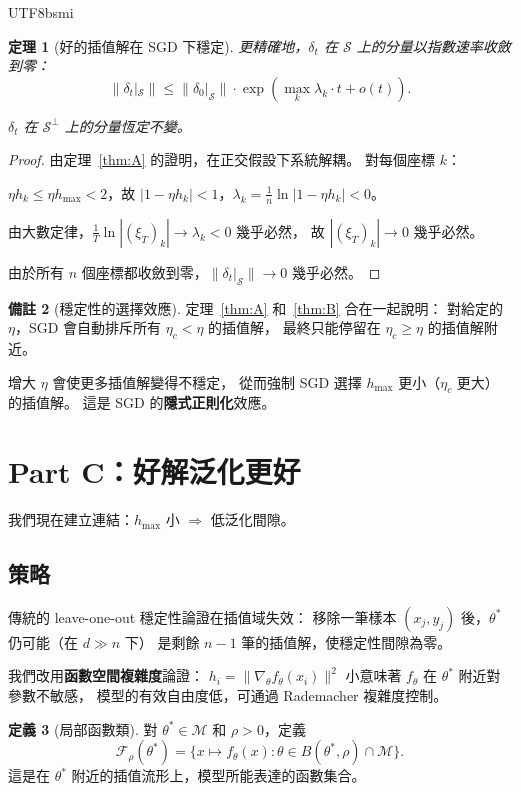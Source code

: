 \documentclass[11pt,a4paper]{article}
\newtheorem{theorem}{定理}
\theoremstyle{definition}
\newtheorem{definition}[theorem]{定義}
\newtheorem{remark}[theorem]{備註}
\newcommand{\cM}{\mathcal{M}}
\newcommand{\cS}{\mathcal{S}}
\newcommand{\cF}{\mathcal{F}}
\begin{document}
\begin{CJK}{UTF8}{bsmi}
\begin{theorem}[好的插值解在 SGD 下穩定]
  更精確地，$\delta_t$ 在 $\cS$ 上的分量以指數速率收斂到零：
  \[
    \|\delta_t|_\cS\|\leq\|\delta_0|_\cS\|\cdot\exp\!\left(\max_k\lambda_k\cdot t+o(t)\right).
  \]

  $\delta_t$ 在 $\cS^\perp$ 上的分量恆定不變。
\end{theorem}

\begin{proof}
  由定理~\ref{thm:A} 的證明，在正交假設下系統解耦。
  對每個座標 $k$：

  $\eta h_k\leq\eta h_{\max}<2$，故 $|1-\eta h_k|<1$，$\lambda_k=\frac{1}{n}\ln|1-\eta h_k|<0$。

  由大數定律，$\frac{1}{T}\ln|(\xi_T)_k|\to\lambda_k<0$ 幾乎必然，
  故 $|(\xi_T)_k|\to 0$ 幾乎必然。

  由於所有 $n$ 個座標都收斂到零，$\|\delta_t|_\cS\|\to 0$ 幾乎必然。
\end{proof}

\begin{remark}[穩定性的選擇效應]
  定理~\ref{thm:A} 和~\ref{thm:B} 合在一起說明：
  對給定的 $\eta$，SGD 會自動排斥所有 $\eta_c<\eta$ 的插值解，
  最終只能停留在 $\eta_c\geq\eta$ 的插值解附近。

  增大 $\eta$ 會使更多插值解變得不穩定，
  從而強制 SGD 選擇 $h_{\max}$ 更小（$\eta_c$ 更大）的插值解。
  這是 SGD 的\textbf{隱式正則化}效應。
\end{remark}

\section{Part C：好解泛化更好}

我們現在建立連結：$h_{\max}$ 小 $\Rightarrow$ 低泛化間隙。

\subsection{策略}

傳統的 leave-one-out 穩定性論證在插值域失效：
移除一筆樣本 $(x_j,y_j)$ 後，$\theta^*$ 仍可能（在 $d\gg n$ 下）
是剩餘 $n-1$ 筆的插值解，使穩定性間隙為零。

我們改用\textbf{函數空間複雜度}論證：
$h_i=\|\nabla_\theta f_\theta(x_i)\|^2$ 小意味著
$f_\theta$ 在 $\theta^*$ 附近對參數不敏感，
模型的有效自由度低，可通過 Rademacher 複雜度控制。

\begin{definition}[局部函數類]
  對 $\theta^*\in\cM$ 和 $\rho>0$，定義
  \[
    \cF_\rho(\theta^*) = \{x\mapsto f_\theta(x):\theta\in B(\theta^*,\rho)\cap\cM\}.
  \]
  這是在 $\theta^*$ 附近的插值流形上，模型所能表達的函數集合。
\end{definition}


\end{CJK}
\end{document}
